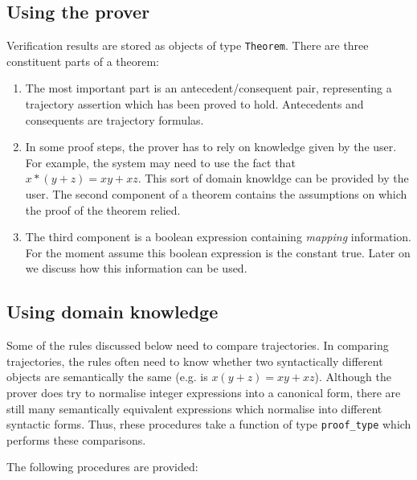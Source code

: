 \subsection{Using the prover}

Verification results are stored as objects of type {\tt Theorem}.
There are three constituent parts of a theorem:
\begin{enumerate}
\item 
The most important part is an antecedent/consequent pair, representing
a trajectory assertion which has been proved to hold.  
Antecedents and consequents are trajectory formulas. 

\item
In some
proof steps, the prover has to rely on knowledge given
by the user. For example, the system may need to use
the fact that $x*(y+z) = xy+xz$. This sort of domain
knowldge can be provided by the user. The second component
of a theorem contains the assumptions on which the proof 
of the theorem relied.

\item
The third component is a boolean expression containing 
{\em mapping} information. For the moment assume this
boolean expression is the constant true. Later on we
discuss how this information can be used.
\end{enumerate}


\subsection{Using domain knowledge}


Some of the rules discussed below need to compare trajectories.
In comparing trajectories, the rules often need to know whether
two syntactically different objects are semantically the
same (e.g. is $x(y+z) = xy+xz$). Although the prover does 
try to normalise integer expressions into a canonical form,
there are still many semantically equivalent expressions which
normalise into different syntactic forms. Thus,
rhese procedures take a function of type {\tt proof\_type} which
performs these comparisons. 

The following procedures are
provided:


